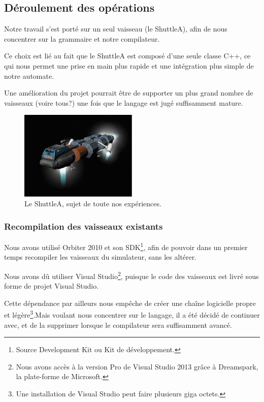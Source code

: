 \documentclass[a4paper,11pt]{article}
\begin{document}
    \subsection{Déroulement des opérations}
        Notre travail s'est porté sur un seul vaisseau (le ShuttleA), afin de nous concentrer sur la grammaire et notre compilateur. 
        
        Ce choix est lié au fait que le ShuttleA est composé d'une seule classe C++, ce qui nous permet une prise en main plus rapide et une intégration plus simple de notre automate. 
        
        Une amélioration du projet pourrait être de supporter un plus grand nombre de vaisseaux (voire tous?) une fois que le langage est jugé suffisamment mature.

        \begin{figure}[!h]
            \begin{center}
                \includegraphics[width=0.5\textwidth]{img/shuttleA.png}
                \caption{Le ShuttleA, sujet de toute nos expériences.}
            \end{center}
        \end{figure}


    \subsubsection{Recompilation des vaisseaux existants}
        Nous avons utilisé Orbiter 2010 et son SDK\footnote{Source Development Kit ou Kit de développement.}, afin de pouvoir dans un premier temps recompiler les vaisseaux du simulateur, sans les altérer.

        Nous avons dû utiliser Visual Studio\footnote{Nous avons accès à la version Pro de Visual Studio 2013 grâce à Dreamspark, la plate-forme de Microsoft.}, puisque le code des vaisseaux est livré sous forme de projet Visual Studio. 
        
        Cette dépendance par ailleurs nous empêche de créer une chaîne logicielle propre et légère\footnote{Une installation de Visual Studio peut faire plusieurs giga octets.}.Mais voulant nous concentrer sur le langage, il a été décidé de continuer avec, et de la supprimer lorsque le compilateur sera suffisamment avancé.
\end{document}
